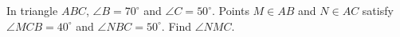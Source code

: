 In triangle $ ABC $, $\angle B=70^\circ $ and $\angle C=50^\circ $. Points $ M\in AB $ and $ N\in AC $ satisfy $\angle MCB=40^\circ $ and $\angle NBC=50^\circ $. Find $\angle NMC $.
